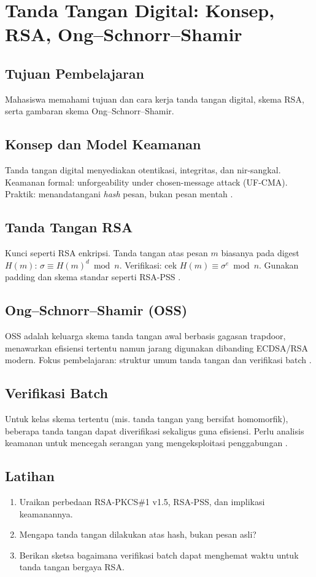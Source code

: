 \documentclass[../main.tex]{subfiles}
\begin{document}
\chapter{Tanda Tangan Digital: Konsep, RSA, Ong--Schnorr--Shamir}

\section{Tujuan Pembelajaran}
Mahasiswa memahami tujuan dan cara kerja tanda tangan digital, skema RSA, serta gambaran skema Ong--Schnorr--Shamir.

\section{Konsep dan Model Keamanan}
Tanda tangan digital menyediakan otentikasi, integritas, dan nir-sangkal. Keamanan formal: unforgeability under chosen-message attack (UF-CMA). Praktik: menandatangani \emph{hash} pesan, bukan pesan mentah \citep{katzlindell}.

\section{Tanda Tangan RSA}
Kunci seperti RSA enkripsi. Tanda tangan atas pesan \(m\) biasanya pada digest \(H(m)\): \(\sigma\equiv H(m)^d\bmod n\). Verifikasi: cek \(H(m)\equiv \sigma^e\bmod n\). Gunakan padding dan skema standar seperti RSA-PSS \citep{katzlindell,stallings}.

\section{Ong--Schnorr--Shamir (OSS)}
OSS adalah keluarga skema tanda tangan awal berbasis gagasan trapdoor, menawarkan efisiensi tertentu namun jarang digunakan dibanding ECDSA/RSA modern. Fokus pembelajaran: struktur umum tanda tangan dan verifikasi batch \citep{stallings}.

\section{Verifikasi Batch}
Untuk kelas skema tertentu (mis. tanda tangan yang bersifat homomorfik), beberapa tanda tangan dapat diverifikasi sekaligus guna efisiensi. Perlu analisis keamanan untuk mencegah serangan yang mengeksploitasi penggabungan \citep{katzlindell}.

\section{Latihan}
\begin{enumerate}
  \item Uraikan perbedaan RSA-PKCS\#1 v1.5, RSA-PSS, dan implikasi keamanannya.
  \item Mengapa tanda tangan dilakukan atas hash, bukan pesan asli?
  \item Berikan sketsa bagaimana verifikasi batch dapat menghemat waktu untuk tanda tangan bergaya RSA.
\end{enumerate}
\end{document}
